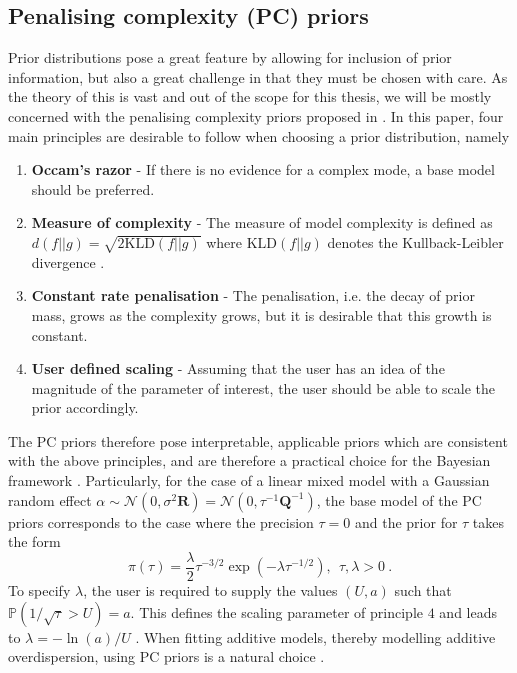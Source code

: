 \subsection{Penalising complexity (PC) priors}
\label{seq:PC_prior}
Prior distributions pose a great feature by allowing for inclusion of prior information, but also a great challenge in that they must be chosen with care.
As the theory of this is vast and out of the scope for this thesis, we will be mostly concerned with the penalising complexity priors proposed in \citet{simpson2017penalising}.
In this paper, four main principles are desirable to follow when choosing a prior distribution, namely 
\begin{enumerate}
    \item \textbf{Occam's razor} - If there is no evidence for a complex mode, a base model should be preferred. 
    \item \textbf{Measure of complexity} - The measure of model complexity is defined as $d(f \lvert \lvert g) = \sqrt{2 \text{KLD}(f \lvert \lvert g)}$ where $\text{KLD}(f \lvert \lvert g)$ denotes the Kullback-Leibler divergence \citep[for more information]{simpson2017penalising}.
    \item \textbf{Constant rate penalisation} - The penalisation, i.e. the decay of prior mass, grows as the complexity grows, but it is desirable that this growth is constant.
    \item \textbf{User defined scaling} - Assuming that the user has an idea of the magnitude of the parameter of interest, the user should be able to scale the prior accordingly.
\end{enumerate}
The PC priors therefore pose interpretable, applicable priors which are consistent with the above principles, and are therefore a practical choice for the Bayesian framework \citep{simpson2017penalising}. 
Particularly, for the case of a linear mixed model with a Gaussian random effect $\alpha \sim \mathcal{N}(0, \sigma^2 \mathbf{R}) = \mathcal{N}(0, \tau^{-1} \mathbf{Q}^{-1})$, the base model of the PC priors corresponds to the case where the precision $\tau=0$ and the prior for $\tau$ takes the form
\begin{equation}
    \label{eq:PC_prior}
    \pi(\tau) = \frac{\lambda}{2} \tau^{-3/2} \exp\left(-\lambda \tau^{-1/2}\right), \ \   \tau, \lambda>0 \ .
\end{equation}
To specify $\lambda$, the user is required to supply the values $(U, a)$ such that $\mathbb{P}(1/\sqrt{\tau} > U) = a$. 
This defines the scaling parameter of principle $4$ and leads to $\lambda=-\ln(a)/U$ \citep{simpson2017penalising}.
When fitting additive models, thereby modelling additive overdispersion, using PC priors is a natural choice \citep{gomezrubio2020inla}.

